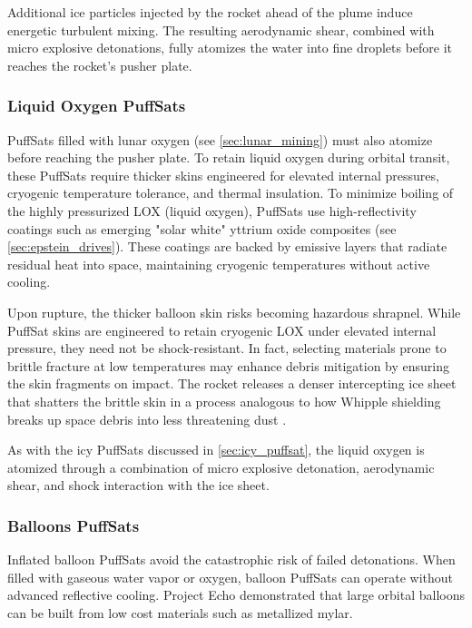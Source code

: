 \documentclass{article}
\begin{document}
Additional ice particles injected by the rocket ahead of the plume induce energetic turbulent mixing. The resulting aerodynamic shear, combined with micro explosive detonations, fully atomizes the water into fine droplets before it reaches the rocket’s pusher plate.

\subsubsection{Liquid Oxygen PuffSats}
PuffSats filled with lunar oxygen (see \autoref{sec:lunar_mining}) must also atomize before reaching the pusher plate. To retain liquid oxygen during orbital transit, these PuffSats require thicker skins engineered for elevated internal pressures, cryogenic temperature tolerance, and thermal insulation. To minimize boiling of the highly pressurized LOX (liquid oxygen), PuffSats use high-reflectivity coatings such as emerging "solar white" yttrium oxide composites (see \autoref{sec:epstein_drives}).  These coatings are backed by emissive layers that radiate residual heat into space, maintaining cryogenic temperatures without active cooling.

Upon rupture, the thicker balloon skin risks becoming hazardous shrapnel. While PuffSat skins are engineered to retain cryogenic LOX under elevated internal pressure, they need not be shock-resistant. In fact, selecting materials prone to brittle fracture at low temperatures may enhance debris mitigation by ensuring the skin fragments on impact. The rocket releases a denser intercepting ice sheet that shatters the brittle skin in a process analogous to how Whipple shielding breaks up space debris into less threatening dust \cite{whipple_shield}.

As with the icy PuffSats discussed in \autoref{sec:icy_puffsat}, the liquid oxygen is atomized through a combination of micro explosive detonation, aerodynamic shear, and shock interaction with the ice sheet.

\subsubsection{Balloons PuffSats}
Inflated balloon PuffSats avoid the catastrophic risk of failed detonations.  When filled with gaseous water vapor or oxygen, balloon PuffSats can operate without advanced reflective cooling. Project Echo \cite{JPL_EchoQL2010} demonstrated that large orbital balloons can be built from low cost materials such as metallized mylar.
\end{document}
